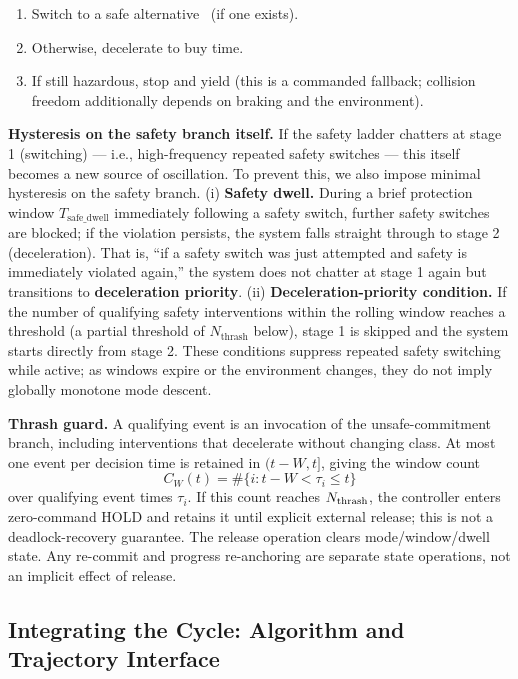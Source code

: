 \begin{enumerate}
\item Switch to a safe alternative \Class\ (if one exists).
\item Otherwise, decelerate to buy time.
\item If still hazardous, stop and yield (this is a commanded fallback; collision freedom additionally depends on braking and the environment).
\end{enumerate}

\noindent\textbf{Hysteresis on the safety branch itself.} If the safety ladder chatters at stage 1 (switching) --- i.e., high-frequency repeated safety switches --- this itself becomes a new source of oscillation. To prevent this, we also impose minimal hysteresis on the safety branch. (i) \textbf{Safety dwell.} During a brief protection window $T_{\text{safe\_dwell}}$ immediately following a safety switch, further safety switches are blocked; if the violation persists, the system falls straight through to stage 2 (deceleration). That is, ``if a safety switch was just attempted and safety is immediately violated again,'' the system does not chatter at stage 1 again but transitions to \textbf{deceleration priority}. (ii) \textbf{Deceleration-priority condition.} If the number of qualifying safety interventions within the rolling window reaches a threshold (a partial threshold of $N_{\text{thrash}}$ below), stage 1 is skipped and the system starts directly from stage 2. These conditions suppress repeated safety switching while active; as windows expire or the environment changes, they do not imply globally monotone mode descent.

\noindent\textbf{Thrash guard.} A qualifying event is an invocation of the unsafe-commitment branch, including interventions that decelerate without changing class. At most one event per decision time is retained in $(t-W,t]$, giving the window count
\begin{equation}
C_W(t)=\#\{i:t-W<\tau_i\le t\}
\label{eq:window}
\end{equation}
over qualifying event times $\tau_i$. If this count reaches $N_{\rm thrash}$, the controller enters zero-command HOLD and retains it until explicit external release; this is not a deadlock-recovery guarantee. The release operation clears mode/window/dwell state. Any re-commit and progress re-anchoring are separate state operations, not an implicit effect of release.

\subsection{Integrating the Cycle: Algorithm and Trajectory Interface}\label{subsec:algo}

